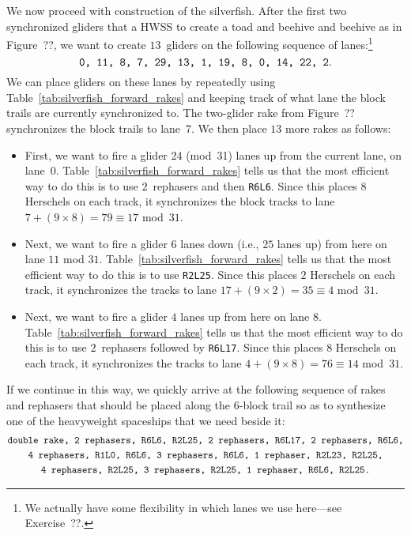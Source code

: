 We now proceed with construction of the silverfish. After the first two synchronized gliders that a HWSS to create a toad and beehive and beehive as in Figure~??, we want to create $13$~gliders on the following sequence of lanes:\footnote{We actually have some flexibility in which lanes we use here---see Exercise~??.}%
\[
	\text{\texttt{0, 11, 8, 7, 29, 13, 1, 19, 8, 0, 14, 22, 2}.}
\]
We can place gliders on these lanes by repeatedly using Table~\ref{tab:silverfish_forward_rakes} and keeping track of what lane the block trails are currently synchronized to. The two-glider rake from Figure~?? synchronizes the block trails to lane~7. We then place $13$ more rakes as follows:\smallskip

\begin{itemize}
	\item First, we want to fire a glider 24 (mod~31) lanes up from the current lane, on lane~0. Table~\ref{tab:silverfish_forward_rakes} tells us that the most efficient way to do this is to use $2$~rephasers and then \texttt{R6L6}. Since this places $8$ Herschels on each track, it synchronizes the block tracks to lane $7 + (9 \times 8) = 79 \equiv 17$ mod~$31$.\smallskip
	
	\item Next, we want to fire a glider $6$ lanes down (i.e., $25$ lanes up) from here on lane $11$ mod $31$. Table~\ref{tab:silverfish_forward_rakes} tells us that the most efficient way to do this is to use \texttt{R2L25}. Since this places $2$ Herschels on each track, it synchronizes the tracks to lane $17 + (9 \times 2) = 35 \equiv 4$ mod~$31$.\smallskip
	
	\item Next, we want to fire a glider $4$ lanes up from here on lane $8$. Table~\ref{tab:silverfish_forward_rakes} tells us that the most efficient way to do this is to use $2$~rephasers followed by \texttt{R6L17}. Since this places $8$ Herschels on each track, it synchronizes the tracks to lane $4 + (9 \times 8) = 76 \equiv 14$ mod~$31$.\smallskip
\end{itemize}

If we continue in this way, we quickly arrive at the following sequence of rakes and rephasers that should be placed along the $6$-block trail so as to synthesize one of the heavyweight spaceships that we need beside it:
\begin{gather*}
	\text{\texttt{double rake, 2 rephasers, R6L6, R2L25, 2 rephasers, R6L17, 2 rephasers, R6L6,}} \\
	\text{\texttt{4 rephasers, R1L0, R6L6, 3 rephasers, R6L6, 1 rephaser, R2L23, R2L25,}} \\
	\text{\texttt{4 rephasers, R2L25, 3 rephasers, R2L25, 1 rephaser, R6L6, R2L25.}}
\end{gather*}

